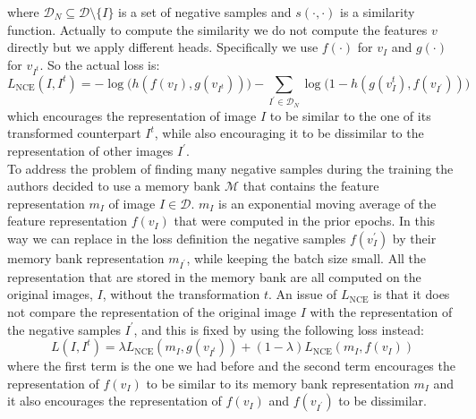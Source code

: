 where $\mathcal{D}_N \subseteq \mathcal{D} \setminus \{I\}$ is a set of negative samples and $s(\cdot, \cdot)$ is a similarity function. Actually to compute the similarity we do not compute the features $v$ directly but we apply different heads. Specifically we use $f(\cdot)$ for $v_I$ and $g(\cdot)$ for $v_{I^t}$. So the actual loss is:
\[L_{\text{NCE}}(I, I^t) = -\log\big(h(f(v_I), g(v_{I^t}))\big) - \sum_{I^\prime \in \mathcal{D}_N} \log\big(1 - h(g(v^t_I), f(v_{I^\prime}))\big) \]
which encourages the representation of image $I$ to be similar to the one of its transformed counterpart $I^t$, while also encouraging it to be dissimilar to the representation of other images $I^\prime$.\\
To address the problem of finding many negative samples during the training the authors decided to use a memory bank $\mathcal{M}$ that contains the feature representation $m_I$ of image $I \in \mathcal{D}$. $m_I$ is an exponential moving average of the feature representation $f(v_I)$ that were computed in the prior epochs. In this way we can replace in the loss definition the negative samples $f(v^\prime_I)$ by their memory bank representation $m_{I^\prime}$, while keeping the batch size small. All the representation that are stored in the memory bank are all computed on the original images, $I$, without the transformation $t$. An issue of $L_{\text{NCE}}$ is that it does not compare the representation of the original image $I$ with the representation of the negative samples $I^\prime$, and this is fixed by using the following loss instead:
\[ L(I,I^t) = \lambda L_{\text{NCE}}(m_I, g(v_{I^t})) + (1-\lambda)L_{\text{NCE}}(m_I, f(v_I)) \]
where the first term is the one we had before and the second term encourages the representation of $f(v_I)$ to be similar to its memory bank representation $m_I$ and it also encourages the representation of $f(v_I)$ and $f(v_{I^\prime})$ to be dissimilar. 
